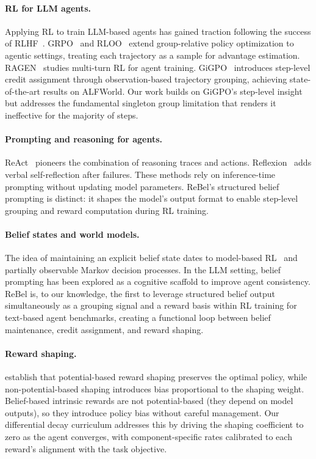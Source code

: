 \documentclass{article}
\begin{document}
\paragraph{RL for LLM agents.}
Applying RL to train LLM-based agents has gained traction following the success
of RLHF~\citep{ouyang2022training}.
GRPO~\citep{shao2024deepseekmath} and RLOO~\citep{ahmadian2024back} extend
group-relative policy optimization to agentic settings, treating each trajectory
as a sample for advantage estimation.
RAGEN~\citep{wang2025ragen} studies multi-turn RL for agent training.
GiGPO~\citep{feng2025gigpo} introduces step-level credit assignment through
observation-based trajectory grouping, achieving state-of-the-art results on
ALFWorld.
Our work builds on GiGPO's step-level insight but addresses the fundamental
singleton group limitation that renders it ineffective for the majority of steps.

\paragraph{Prompting and reasoning for agents.}
ReAct~\citep{yao2023react} pioneers the combination of reasoning traces and actions.
Reflexion~\citep{shinn2024reflexion} adds verbal self-reflection after failures.
These methods rely on inference-time prompting without updating model parameters.
ReBel's structured belief prompting is distinct: it shapes the model's output
format to enable step-level grouping and reward computation during RL training.

\paragraph{Belief states and world models.}
The idea of maintaining an explicit belief state dates to model-based
RL~\citep{dyna1991sutton} and partially observable Markov decision processes.
In the LLM setting, belief prompting has been explored as a cognitive scaffold
to improve agent consistency.
ReBel is, to our knowledge, the first to leverage structured belief output
simultaneously as a grouping signal and a reward basis within RL training
for text-based agent benchmarks, creating a functional loop between belief
maintenance, credit assignment, and reward shaping.

\paragraph{Reward shaping.}
\citet{ng1999policy} establish that potential-based reward shaping preserves
the optimal policy, while non-potential-based shaping introduces bias
proportional to the shaping weight.
Belief-based intrinsic rewards are not potential-based (they depend on model
outputs), so they introduce policy bias without careful management.
Our differential decay curriculum addresses this by driving the shaping
coefficient to zero as the agent converges, with component-specific rates
calibrated to each reward's alignment with the task objective.
\end{document}
